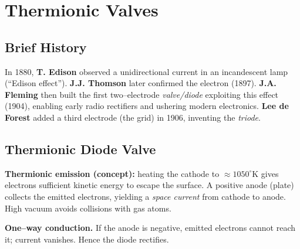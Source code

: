 \section{Thermionic Valves}

\subsection{Brief History}
In 1880, \textbf{T. Edison} observed a unidirectional current in an incandescent lamp (``Edison effect''). \textbf{J.J. Thomson} later confirmed the electron (1897). \textbf{J.A. Fleming} then built the first two–electrode \emph{valve/diode} exploiting this effect (1904), enabling early radio rectifiers and ushering modern electronics. \textbf{Lee de Forest} added a third electrode (the grid) in 1906, inventing the \emph{triode}.

\subsection{Thermionic Diode Valve}

\textbf{Thermionic emission (concept): }
heating the cathode to $\approx 1050^\circ\mathrm{K}$ gives electrons sufficient kinetic energy to escape the surface. A positive anode (plate) collects the emitted electrons, yielding a \emph{space current} from cathode to anode. High vacuum avoids collisions with gas atoms.

\textbf{One–way conduction.}
If the anode is negative, emitted electrons cannot reach it; current vanishes. Hence the diode rectifies.

